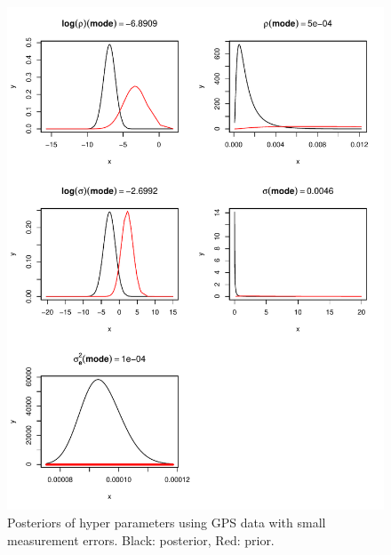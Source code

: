 \documentclass[a4paper,12pt]{article}
\begin{document}
 \begin{figure}[htbp]
 \begin{center}
 \includegraphics{fig/sMesh_sErr_hyperpar.pdf}
 \end{center}
 \caption[Hyper parameter with small errors]{Posteriors of hyper parameters using GPS data with small measurement errors. Black: posterior, Red: prior.}
 \label{fig:1}
 \end{figure}
\end{document}
